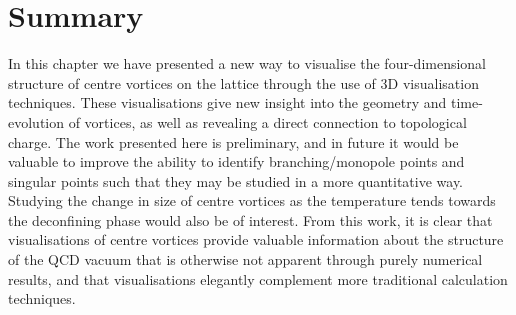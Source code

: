\section{Summary}
In this chapter we have presented a new way to visualise the four-dimensional structure of centre vortices on the lattice through the use of 3D visualisation techniques. These visualisations give new insight into the geometry and time-evolution of vortices, as well as revealing a direct connection to topological charge. The work presented here is preliminary, and in future it would be valuable to improve the ability to identify branching/monopole points and singular points such that they may be studied in a more quantitative way. Studying the change in size of centre vortices as the temperature tends towards the deconfining phase would also be of interest. From this work, it is clear that visualisations of centre vortices provide valuable information about the structure of the QCD vacuum that is otherwise not apparent through purely numerical results, and that visualisations elegantly complement more traditional calculation techniques.
